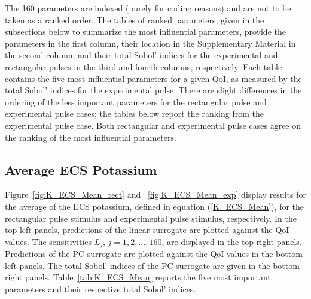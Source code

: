 \documentclass[smallextended]{svjour3}
\numberwithin{equation}{section}
\begin{document}
The 160 parameters are indexed (purely for coding reasons) and are not to be taken as a ranked order. The tables of ranked parameters, given in the subsections below to summarize the most influential parameters, provide the parameters in the first column, their location in the Supplementary Material in the second column, and their total Sobol' indices for the experimental and rectangular pulses in the third and fourth columns, respectively. Each table contains the five most influential parameters for a given QoI, as measured by the total Sobol' indices for the experimental pulse. There are slight differences in the ordering of the less important parameters for the rectangular pulse and experimental pulse cases; the tables below report the ranking from the experimental pulse case. Both rectangular and experimental pulse cases agree on the ranking of the most influential parameters.

\subsection{Average ECS Potassium}
\label{sec:qoi_K_ECS_Mean}

Figure~\ref{fig:K_ECS_Mean_rect} and ~\ref{fig:K_ECS_Mean_exp} display results for the average of the ECS potassium, defined in equation (\ref{K_ECS_Mean}), for the rectangular pulse stimulus and experimental pulse stimulus, respectively. In the top left panels, predictions of the linear surrogate are plotted against the QoI values. The sensitivities $L_j$, $j=1,2,\dots,160$, are displayed in the top right panels. Predictions of the PC surrogate are plotted against the QoI values in the bottom left panels. The total Sobol' indices of the PC surrogate are given in the bottom right panels. Table~\ref{tab:K_ECS_Mean} reports the five most important parameters and their respective total Sobol' indices.
\end{document}
